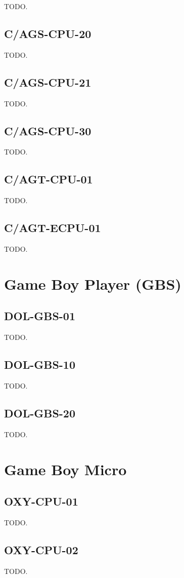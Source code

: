 TODO.

\subsection{C/AGS-CPU-20}

TODO.

\subsection{C/AGS-CPU-21}

TODO.

\subsection{C/AGS-CPU-30}

TODO.

\subsection{C/AGT-CPU-01}

TODO.

\subsection{C/AGT-ECPU-01}

TODO.

\section{Game Boy Player (GBS)}

\subsection{DOL-GBS-01}

TODO.

\subsection{DOL-GBS-10}

TODO.

\subsection{DOL-GBS-20}

TODO.

\section{Game Boy Micro}

\subsection{OXY-CPU-01}

TODO.

\subsection{OXY-CPU-02}

TODO.

